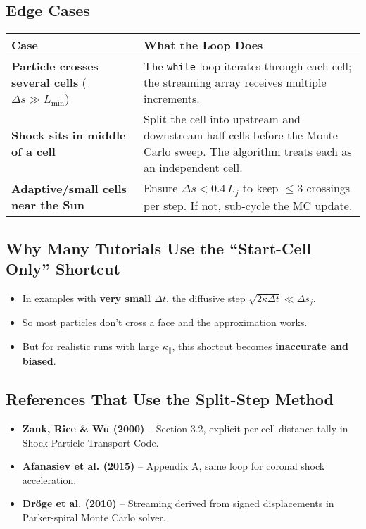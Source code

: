 \subsection*{Edge Cases}

\begin{tabular}{|p{5.5cm}|p{9.5cm}|}
\hline
\textbf{Case} & \textbf{What the Loop Does} \\
\hline
\textbf{Particle crosses several cells} ($\Delta s \gg L_{\min}$) &
The \texttt{while} loop iterates through each cell; the streaming array receives multiple increments. \\
\hline
\textbf{Shock sits in middle of a cell} &
Split the cell into upstream and downstream half-cells before the Monte Carlo sweep. The algorithm treats each as an independent cell. \\
\hline
\textbf{Adaptive/small cells near the Sun} &
Ensure $\Delta s < 0.4\,L_j$ to keep $\leq 3$ crossings per step. If not, sub-cycle the MC update. \\
\hline
\end{tabular}

\subsection*{Why Many Tutorials Use the “Start-Cell Only” Shortcut}

\begin{itemize}
  \item In examples with \textbf{very small $\Delta t$}, the diffusive step $\sqrt{2\kappa\Delta t} \ll \Delta s_j$.
  \item So most particles don’t cross a face and the approximation works.
  \item But for realistic runs with large $\kappa_\parallel$, this shortcut becomes \textbf{inaccurate and biased}.
\end{itemize}

\subsection*{References That Use the Split-Step Method}

\begin{itemize}
  \item \textbf{Zank, Rice \& Wu (2000)} – Section 3.2, explicit per-cell distance tally in Shock Particle Transport Code.
  \item \textbf{Afanasiev et al. (2015)} – Appendix A, same loop for coronal shock acceleration.
  \item \textbf{Dröge et al. (2010)} – Streaming derived from signed displacements in Parker-spiral Monte Carlo solver.
\end{itemize}

